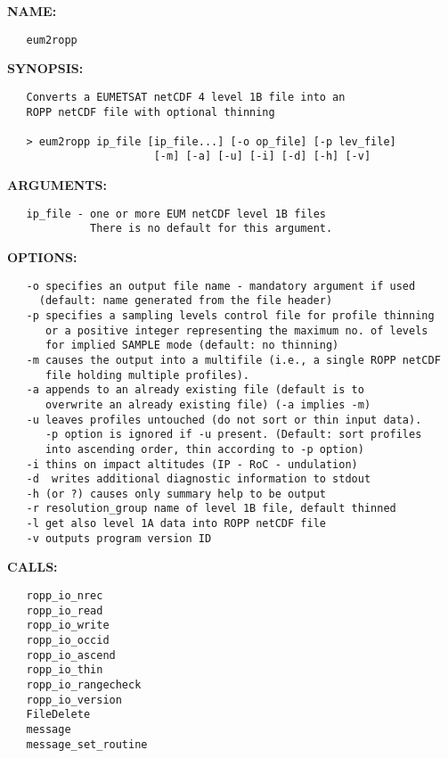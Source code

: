 \label{ch:robo83}
\label{ch:Programs_eum2ropp}
\textbf{NAME:}\hspace{0.08in}\begin{Verbatim}
   eum2ropp
\end{Verbatim}
\textbf{SYNOPSIS:}\hspace{0.08in}\begin{Verbatim}
   Converts a EUMETSAT netCDF 4 level 1B file into an
   ROPP netCDF file with optional thinning

   > eum2ropp ip_file [ip_file...] [-o op_file] [-p lev_file]
                       [-m] [-a] [-u] [-i] [-d] [-h] [-v]
\end{Verbatim}
\textbf{ARGUMENTS:}\hspace{0.08in}\begin{Verbatim}
   ip_file - one or more EUM netCDF level 1B files
             There is no default for this argument.
\end{Verbatim}
\textbf{OPTIONS:}\hspace{0.08in}\begin{Verbatim}
   -o specifies an output file name - mandatory argument if used
     (default: name generated from the file header)
   -p specifies a sampling levels control file for profile thinning
      or a positive integer representing the maximum no. of levels
      for implied SAMPLE mode (default: no thinning)
   -m causes the output into a multifile (i.e., a single ROPP netCDF
      file holding multiple profiles).
   -a appends to an already existing file (default is to
      overwrite an already existing file) (-a implies -m)
   -u leaves profiles untouched (do not sort or thin input data).
      -p option is ignored if -u present. (Default: sort profiles
      into ascending order, thin according to -p option)
   -i thins on impact altitudes (IP - RoC - undulation)
   -d  writes additional diagnostic information to stdout
   -h (or ?) causes only summary help to be output
   -r resolution_group name of level 1B file, default thinned
   -l get also level 1A data into ROPP netCDF file
   -v outputs program version ID
\end{Verbatim}
\textbf{CALLS:}\hspace{0.08in}\begin{Verbatim}
   ropp_io_nrec
   ropp_io_read
   ropp_io_write
   ropp_io_occid
   ropp_io_ascend
   ropp_io_thin
   ropp_io_rangecheck
   ropp_io_version
   FileDelete
   message
   message_set_routine
\end{Verbatim}
